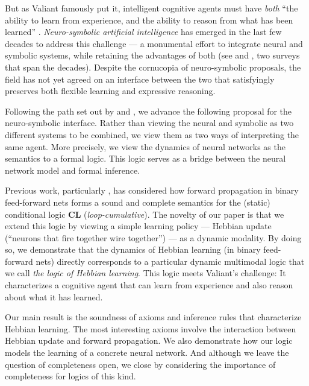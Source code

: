 \documentclass[letterpaper]{article}
\theoremstyle{definition}
\begin{document}
But as Valiant famously put it, intelligent cognitive agents must have \emph{both} ``the ability to learn from experience, and the ability to reason from what has been learned'' \citep{valiant2003three}.  \emph{Neuro-symbolic artificial intelligence} has emerged in the last few decades to address this challenge --- a monumental effort to integrate neural and symbolic systems, while retaining the advantages of both (see \citep{bader2005dimensions} and \citep{sarker2021neuro}, two surveys that span the decades).  Despite the cornucopia of neuro-symbolic proposals, the field has not yet agreed on an interface between the two that satisfyingly preserves both flexible learning and expressive reasoning.

Following the path set out by \citep{balkenius1991nonmonotonic} and \citep{leitgeb2001nonmonotonic,leitgeb2003nonmonotonic}, we advance the following proposal for the neuro-symbolic interface.  Rather than viewing the neural and symbolic as two different systems to be combined, we view them as two ways of interpreting the same agent.  More precisely, we view the dynamics of neural networks as the semantics to a formal logic.  This logic serves as a bridge between the neural network model and formal inference.

Previous work, particularly \citep{leitgeb2001nonmonotonic}, has considered how forward propagation in binary feed-forward nets forms a sound and complete semantics for the (static) conditional logic \textbf{CL} (\emph{loop-cumulative}).  The novelty of our paper is that we extend this logic by viewing a simple learning policy --- Hebbian update (``neurons that fire together wire together'') --- as a dynamic modality.  By doing so, we demonstrate that the dynamics of Hebbian learning (in binary feed-forward nets) directly corresponds to a particular dynamic multimodal logic that we call \emph{the logic of Hebbian learning}.
This logic meets Valiant's challenge:  It characterizes a cognitive agent that can learn from experience and also reason about what it has learned.

Our main result is the soundness of axioms and inference rules that characterize Hebbian learning.  The most interesting axioms involve the interaction between Hebbian update and forward propagation.  We also demonstrate how our logic models the learning of a concrete neural network. And although we leave the question of completeness open, we close by considering the importance of completeness for logics of this kind.

\end{document}
